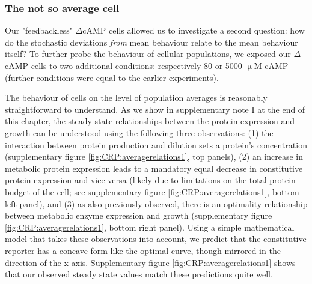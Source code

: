 \subsubsection{The not so average cell}

Our "feedbackless" $\Delta$cAMP cells allowed us to investigate a second question:
how do the stochastic deviations \textit{from} mean behaviour relate to the mean behaviour itself?
%
To further probe the behaviour of cellular populations, we exposed our $\Delta$cAMP cells to two additional conditions: 
%
respectively 80 or 5000 $\upmu$M cAMP (further conditions were equal to the earlier experiments).




The behaviour of cells on the level of population averages is reasonably straightforward to understand.
%
As we show in supplementary note I at the end of this chapter, the steady state relationships between the protein expression and growth 
can be understood using %
the following three observations:
(1) the interaction between protein production and dilution sets a protein's concentration (supplementary figure \ref{fig:CRP:averagerelations1}, top panels), 
(2) an increase in metabolic protein expression leads to a mandatory equal decrease in constitutive protein expression and vice versa 
(likely due to limitations on the total protein budget of the cell; see supplementary figure \ref{fig:CRP:averagerelations1}, bottom left panel), 
and 
(3) as also previously observed, there is an optimality relationship between metabolic enzyme expression and growth (supplementary figure \ref{fig:CRP:averagerelations1}, bottom right panel).
%
Using a simple mathematical model that takes these observations into account,
we predict that the constitutive reporter has a concave form like the optimal curve, though mirrored in the direction of the x-axis.
%
Supplementary figure \ref{fig:CRP:averagerelations1} shows that our observed steady state values match these predictions quite well. 



